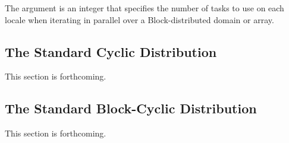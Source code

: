 The argument  is an integer that specifies the
number of tasks to use on each locale when iterating in parallel over
a Block-distributed domain or array.

\subsection{The Standard Cyclic Distribution}
\label{Cyclic_Dist}

This section is forthcoming.

\subsection{The Standard Block-Cyclic Distribution}
\label{Block_Cyclic_Dist}

This section is forthcoming.
